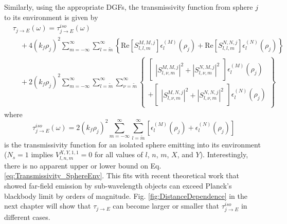 Similarly, using the appropriate DGFs, the transmissivity function from sphere $j$ to its environment is given by
%
\begin{equation}\label{eq:Transmissivity_SphereEnv}
\begin{split}
& \tau_{j \rightarrow E}(\omega) = \tau_{j \rightarrow E}^{iso} (\omega)
\\
& \quad +
4 \left( k_{f} \rho_{j} \right)^{2} \sum\limits_{m=-\infty}^{\infty} \sum\limits_{l=\widetilde{m}}^{\infty}
\left\{ \mathrm{Re} \left[ S_{l,l,m}^{M,M,j} \right] \epsilon_{l}^{(M)}(\rho_{j}) + \mathrm{Re} \left[ S_{l,l,m}^{N,N,j} \right] \epsilon_{l}^{(N)}(\rho_{j}) \right\}
\\
& \quad +
2 \left( k_{f} \rho_{j} \right)^{2} \sum\limits_{m=-\infty}^{\infty} \sum\limits_{l=\widetilde{m}}^{\infty} \sum_{\nu = \widetilde{m}}^{\infty}
\left\{ \begin{array}{r}
\left[ \begin{array}{r}
\left| S_{l,\nu,m}^{M,M,j} \right|^{2}
+ \left| S_{l,\nu,m}^{N,M,j} \right|^{2}
\end{array} \right] \epsilon_{l}^{(M)}(\rho_{j})
\\
+ \left[ \begin{array}{r}
\left| S_{l,\nu,m}^{M,N,j} \right|^{2}
+ \left| S_{l,\nu,m}^{N,N,j} \right|^{2}
\end{array} \right] \epsilon_{l}^{(N)}(\rho_{j})
\end{array} \right\}
\end{split}
\end{equation}
%
where
%
\begin{equation}\label{eq:Transmissivity_IsoSphereEnv}
\tau_{j \rightarrow E}^{iso} (\omega) = 2 \left( k_{f} \rho_{j} \right)^{2} \sum\limits_{m=-\infty}^{\infty} \sum\limits_{l=\widetilde{m}}^{\infty} \left[ \epsilon_{l}^{(M)}(\rho_{j}) + \epsilon_{l}^{(N)}(\rho_{j}) \right]
\end{equation}
%
is the transmissivity function for an isolated sphere emitting into its environment ($N_{s}=1$ implies $V_{l, n, m}^{X,Y,1,1}=0$ for all values of $l$, $n$, $m$, $X$, and $Y$). Interestingly, there is no apparent upper or lower bound on Eq. \ref{eq:Transmissivity_SphereEnv}. This fits with recent theoretical work that showed far-field emission by sub-wavelength objects can exceed Planck's blackbody limit by orders of magnitude.\cite{Fernandez-Hurtado2018} Fig. \ref{fig:DistanceDependence} in the next chapter will show that $\tau_{j \rightarrow E}$ can become larger or smaller that $\tau_{j \rightarrow E}^{iso}$ in different cases.

